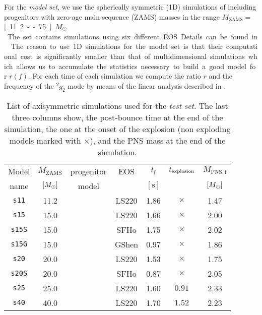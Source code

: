 For the {\it model set}, we use the spherically symmetric (1D) simulations of \citep{Torres:2019a}
including progenitors with zero-age main sequence (ZAMS) masses in the range 
$M_{\mathrm{ZAMS}}=$ \unit[11.2 -- 75]{$M_{\odot}$}. The set contains simulations using  
six different EOS. Details can be found in
 \citep{Torres:2019a}. The reason to use 1D simulations for the model set
 is that their computational cost is significantly smaller than that of multidimensional
 simulations which allows us to accumulate the statistics necessary to build a good model for $r(f)$.
 {For each time of each simulation we compute the ratio $r$ and the frequency of the $^2g_2$ mode by means of the linear analysis
 described in \cite{Torres:2018,Torres:2019a,Torres:2019b}. } 
 
 \begin{table}
 \centering
 \begin{tabular}{c|ccc|ccc}
  \hline
  Model & $M_\mathrm{ZAMS} $ & progenitor& EOS & $t_{\mathrm{f}}$& $t_{\rm explosion}$ & $M_{\mathrm{PNS, f}}$\\
  name& $[M_{\odot}]$ & model & & $[\mathrm{s}]$& & $[M_{\odot}]$ 
  \\ 
  \hline
  \texttt{s11} & 11.2 & \cite{Woosley_Heger_Weaver__2002__ReviewsofModernPhysics__The_evolution_and_explosion_of_massive_stars}& LS220 & 1.86 & $\times$ & 1.47 
  \\ 
  \texttt{s15} & 15.0 & \cite{Woosley_Heger_Weaver__2002__ReviewsofModernPhysics__The_evolution_and_explosion_of_massive_stars}& LS220 & 1.66 & $\times$ & 2.00 
    \\ 
  \texttt{s15S} & 15.0 & \cite{Woosley_Heger_Weaver__2002__ReviewsofModernPhysics__The_evolution_and_explosion_of_massive_stars}& SFHo & 1.75 & $\times$ & 2.02 
    \\ 
  \texttt{s15G} & 15.0 & \cite{Woosley_Heger_Weaver__2002__ReviewsofModernPhysics__The_evolution_and_explosion_of_massive_stars}& GShen & 0.97 & $\times$ & 1.86
     \\ 
  \texttt{s20} & 20.0 & \cite{Woosley_Heger_Weaver__2002__ReviewsofModernPhysics__The_evolution_and_explosion_of_massive_stars}& LS220 & 1.53 & $\times$ & 1.75 
    \\ 
  \texttt{s20S} & 20.0 & \cite{Woosley_Heger__2007__physrep__Nucleosynthesisandremnantsinmassivestarsofsolarmetallicity} & SFHo & 0.87 & $\times$ & 2.05 
  \\ 
  \texttt{s25} & 25.0 & \cite{Woosley_Heger_Weaver__2002__ReviewsofModernPhysics__The_evolution_and_explosion_of_massive_stars}& LS220 & 1.60 & $0.91$ & 2.33 
    \\ 
  \texttt{s40} & 40.0 & \cite{Woosley_Heger_Weaver__2002__ReviewsofModernPhysics__The_evolution_and_explosion_of_massive_stars}& LS220 & 1.70 & $1.52$ & 2.23 
    \\ \hline
 \end{tabular}
 \caption{%
  List of axisymmetric simulations {used for the {\it test set}}. 
  {The last three columns show, the post-bounce time at the end of the
  simulation, the one at the onset of the explosion (non exploding models marked
  with $\times$), and the PNS mass at the end of the simulation.}
 }
 \label{Tab:2dSimList}
\end{table}

